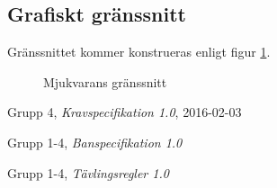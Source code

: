 \documentclass[11pt]{article}
\begin{document}
\begin{flushleft}
\pagebreak
\subsection{Grafiskt gränssnitt}
Gränssnittet kommer konstrueras enligt figur \ref{software}.
\begin{figure}[htbp]
\centering
\noindent\resizebox{.5\textwidth}{!}{
		}
	\caption{Mjukvarans gränssnitt \label{software}}
\end{figure}

\setcounter{secnumdepth}{0}
\pagebreak
\begin{thebibliography}{9}

  Grupp 4,
  \emph{Kravspecifikation 1.0},
  2016-02-03
  
	Grupp 1-4,
	\emph{Banspecifikation 1.0}
	
	Grupp 1-4,
	\emph{Tävlingsregler 1.0}

\end{thebibliography}

\setcounter{secnumdepth}{2}

\end{flushleft}
\end{document}
